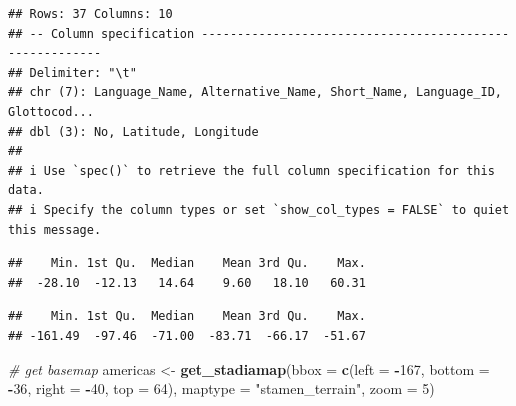 \documentclass[
]{article}
\newenvironment{Shaded}{\begin{snugshade}}{\end{snugshade}}
\newcommand{\AttributeTok}[1]{\textcolor[rgb]{0.13,0.29,0.53}{#1}}
\newcommand{\CommentTok}[1]{\textcolor[rgb]{0.56,0.35,0.01}{\textit{#1}}}
\newcommand{\DecValTok}[1]{\textcolor[rgb]{0.00,0.00,0.81}{#1}}
\newcommand{\FunctionTok}[1]{\textcolor[rgb]{0.13,0.29,0.53}{\textbf{#1}}}
\newcommand{\NormalTok}[1]{#1}
\newcommand{\OtherTok}[1]{\textcolor[rgb]{0.56,0.35,0.01}{#1}}
\newcommand{\SpecialCharTok}[1]{\textcolor[rgb]{0.81,0.36,0.00}{\textbf{#1}}}
\newcommand{\StringTok}[1]{\textcolor[rgb]{0.31,0.60,0.02}{#1}}
\begin{document}
\begin{verbatim}
## Rows: 37 Columns: 10
## -- Column specification --------------------------------------------------------
## Delimiter: "\t"
## chr (7): Language_Name, Alternative_Name, Short_Name, Language_ID, Glottocod...
## dbl (3): No, Latitude, Longitude
## 
## i Use `spec()` to retrieve the full column specification for this data.
## i Specify the column types or set `show_col_types = FALSE` to quiet this message.
\end{verbatim}

\begin{Shaded}
\end{Shaded}

\begin{verbatim}
##    Min. 1st Qu.  Median    Mean 3rd Qu.    Max. 
##  -28.10  -12.13   14.64    9.60   18.10   60.31
\end{verbatim}

\begin{Shaded}
\end{Shaded}

\begin{verbatim}
##    Min. 1st Qu.  Median    Mean 3rd Qu.    Max. 
## -161.49  -97.46  -71.00  -83.71  -66.17  -51.67
\end{verbatim}

\begin{Shaded}
\begin{Highlighting}[]
\CommentTok{\# get basemap}
\NormalTok{americas }\OtherTok{\textless{}{-}} \FunctionTok{get\_stadiamap}\NormalTok{(}\AttributeTok{bbox =} \FunctionTok{c}\NormalTok{(}\AttributeTok{left =} \SpecialCharTok{{-}}\DecValTok{167}\NormalTok{, }\AttributeTok{bottom =} \SpecialCharTok{{-}}\DecValTok{36}\NormalTok{, }\AttributeTok{right =} \SpecialCharTok{{-}}\DecValTok{40}\NormalTok{, }\AttributeTok{top =} \DecValTok{64}\NormalTok{), }\AttributeTok{maptype =} \StringTok{"stamen\_terrain"}\NormalTok{, }\AttributeTok{zoom =} \DecValTok{5}\NormalTok{)}
\end{Highlighting}
\end{Shaded}
\end{document}
